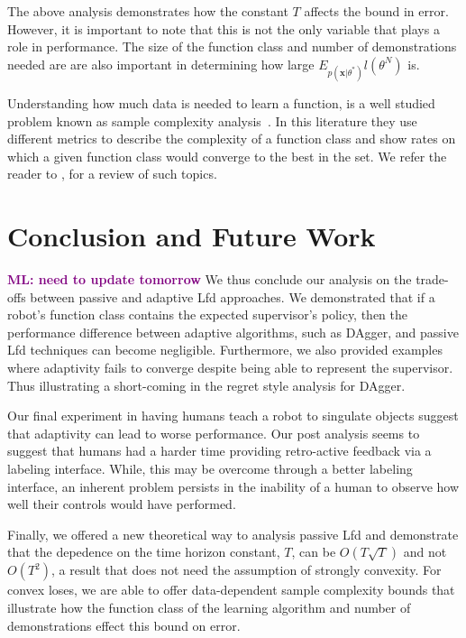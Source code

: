 \documentclass[10pt, conference]{ieeeconf}      %
\newcommand{\bx}{\mathbf{x}}
\newcommand{\mlnote}[1]{\ifthenelse{ \boolean{include-notes}}%
 {\textcolor{purple}{\textbf{ML: #1}}}{}}
\begin{document}
The above analysis demonstrates how the constant $T$ affects the bound in error. However, it is important to note that this is not the only variable that plays a role in performance. The size of the function class and number of demonstrations needed are are also important in determining how large $E_{p(\bx|\theta^*)} l(\theta^N)$ is. 

Understanding how much data is needed to learn a function, is a well studied problem known as sample complexity analysis~\cite{anthony2009neural,bartlett2002rademacher,kakade2009complexity}. In this literature they use different metrics to describe the complexity of a function class and show rates on which a given function class would converge to the best in the set. We refer the reader to \cite{vapnik2013nature}, for a review of such topics. 


\section{Conclusion and Future Work}
\mlnote{need to update tomorrow}
We thus conclude our analysis on the trade-offs between passive and adaptive Lfd approaches. We demonstrated that if a robot's function class contains the expected supervisor's policy, then the  performance difference between adaptive algorithms, such as DAgger,  and passive Lfd techniques can become negligible.  Furthermore, we also provided examples where adaptivity fails to converge despite being able to represent the supervisor. Thus illustrating a short-coming in the regret style analysis for DAgger. 

Our final experiment in having humans teach a robot to singulate objects suggest that adaptivity can lead to worse performance. Our post analysis seems to suggest that humans had a harder time providing retro-active feedback via a labeling interface. While, this may be overcome through a better labeling interface, an inherent problem persists in the inability of a human to observe how well their controls would have performed. 

Finally, we offered a new theoretical  way to analysis passive Lfd and demonstrate that the depedence on the time horizon constant, $T$, can be $O(T\sqrt{T})$ and not $O(T^2)$, a result that does not need the assumption of strongly convexity.  For convex loses, we are able to offer data-dependent sample complexity bounds that illustrate how the function class of the learning algorithm and number of demonstrations effect this bound on error. 
\end{document}
